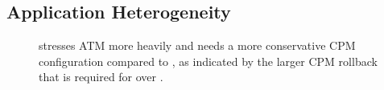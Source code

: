 \subsection{Application Heterogeneity}
\label{sec:process:workload:heterogeneity}


\begin{figure}[h]
    \hfill
    \caption{ stresses ATM more heavily and needs a more conservative CPM configuration compared to , as indicated by the larger CPM rollback that is required for  over .}
    \label{fig:spec-limit-example} 
\end{figure}

